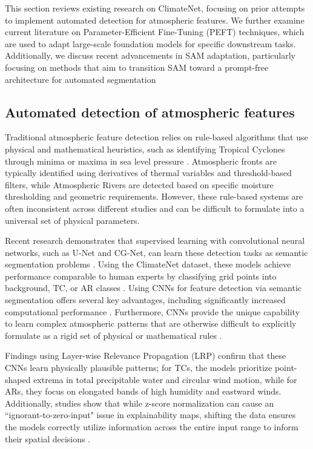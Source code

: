 This section reviews existing research on ClimateNet, focusing on prior attempts to implement automated detection for atmospheric features. We further examine current literature on Parameter-Efficient Fine-Tuning (PEFT) techniques, which are used to adapt large-scale foundation models for specific downstream tasks. Additionally, we discuss recent advancements in SAM adaptation, particularly focusing on methods that aim to transition SAM toward a prompt-free architecture for automated segmentation
\subsection{Automated detection of atmospheric features}
Traditional atmospheric feature detection relies on rule-based algorithms that use physical and mathematical heuristics, such as identifying Tropical Cyclones through minima or maxima in sea level pressure \cite{bourdin2022intercomparison, neu2013imilast}. Atmospheric fronts are typically identified using derivatives of thermal variables and threshold-based filters, while Atmospheric Rivers are detected based on specific moisture thresholding and geometric requirements\cite{beckert2023three, neu2013imilast}. However, these rule-based systems are often inconsistent across different studies and can be difficult to formulate into a universal set of physical parameters.

Recent research demonstrates that supervised learning with convolutional neural networks, such as U-Net and CG-Net, can learn these detection tasks as semantic segmentation problems \cite{lagerquist2019deep, biard2019automated}. Using the ClimateNet dataset, these models achieve performance comparable to human experts by classifying grid points into background, TC, or AR classes \cite{kapp2020spatio, prabhat2020climatenet}. Using CNNs for feature detection via semantic segmentation offers several key advantages, including significantly increased computational performance \cite{neu2013imilast, higgins2023using, radke2024explaining}. Furthermore, CNNs provide the unique capability to learn complex atmospheric patterns that are otherwise difficult to explicitly formulate as a rigid set of physical or mathematical rules \cite{niebler2022automated, tian2023deep, radke2024explaining}.

Findings using Layer-wise Relevance Propagation (LRP) confirm that these CNNs learn physically plausible patterns; for TCs, the models prioritize point-shaped extrema in total precipitable water and circular wind motion, while for ARs, they focus on elongated bands of high humidity and eastward winds. Additionally, studies show that while z-score normalization can cause an ``ignorant-to-zero-input" issue in explainability maps, shifting the data ensures the models correctly utilize information across the entire input range to inform their spatial decisions \cite{radke2024explaining}.
